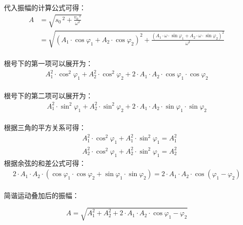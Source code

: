 \documentclass[UTF8]{ctexart}
\begin{document}
\newpage

    代入振幅的计算公式可得：\vspace{3pt}
    \begin{align}
        A
        &=\sqrt{s_0\,^2+\frac{v_0\,^2}{\omega^2}}\\[3mm]
        &=\sqrt{\left(A_1\cdot\cos{\varphi_1}+A_2\cdot\cos{\varphi_2}\right)^2+\frac{\left(A_1\cdot\omega\cdot\sin{\varphi_1}+A_2\cdot\omega\cdot\sin{\varphi_2}\right)^2}{\omega^2}}
    \end{align}\\
    根号下的第一项可以展开为：
    \begin{align}
        A_1^2\cdot\cos^2{\varphi_1}+A_2^2\cdot\cos^2{\varphi_2}+2\cdot A_1\cdot A_2\cdot\cos{\varphi_1}\cdot\cos{\varphi_2}
    \end{align}\\
    根号下的第二项可以展开为：
    \begin{align}
        A_1^2\cdot\sin^2{\varphi_1}+A_2^2\cdot\sin^2{\varphi_2}+2\cdot A_1\cdot A_2\cdot\sin{\varphi_1}\cdot\sin{\varphi_2}
    \end{align}\\
    根据三角的平方关系可得：
    \begin{align}
        &A_1^2\cdot\cos^2{\varphi_1}+A_1^2\cdot\sin^2{\varphi_1}=A_1^2\\[3mm]
        &A_2^2\cdot\cos^2{\varphi_1}+A_2^2\cdot\sin^2{\varphi_1}=A_2^2
    \end{align}
    根据余弦的和差公式可得：
    \begin{align}
        2\cdot A_1\cdot A_2\cdot(\cos{\varphi_1}\cdot\cos{\varphi_2}+\sin{\varphi_1}\cdot\sin{\varphi_2})=2\cdot A_1\cdot A_2\cdot\cos{(\varphi_1-\varphi_2)}
    \end{align}\\
    简谐运动叠加后的振幅：
    \begin{large}
        \begin{equation*}
            A=\sqrt{A_1^2+A_2^2+2\cdot A_1\cdot A_2\cdot\cos{\varphi_1-\varphi_2}}
        \end{equation*}
    \end{large}

\newpage
\end{document}

